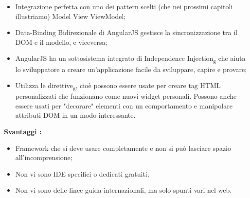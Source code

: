 {{{\begin{itemize}
				\item Integrazione perfetta con uno dei pattern scelti (che nei prossimi capitoli illustriamo) Model View ViewModel;
				\item Data-Binding Bidirezionale di AngularJS gestisce la sincronizzazione tra il DOM e il modello, e viceversa;
				\item AngularJS ha un sottosistema integrato di Independence Injection\textsubscript{g} che aiuta lo sviluppatore a creare un'applicazione facile da sviluppare, capire e provare; 
				\item Utilizza le direttive\textsubscript{g}, cioè possono essere usate per creare tag HTML personalizzati che funzionano come nuovi widget personali. Possono anche essere usati per "decorare" elementi con un comportamento e manipolare attributi DOM in un modo interessante.
			\end{itemize}
			\textbf{Svantaggi :}
			\begin{itemize}\itemsep1pt
				\item Framework che si deve usare completamente e non si può lasciare spazio all'incomprensione;
				\item Non vi sono IDE specifici o dedicati gratuiti;
				\item Non vi sono delle linee guida internazionali, ma solo spunti vari nel web.
			\end{itemize}
		}
}}

